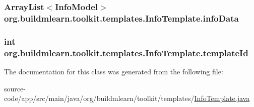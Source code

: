 \subsubsection[{\texorpdfstring{info\+Data}{infoData}}]{\setlength{\rightskip}{0pt plus 5cm}Array\+List$<${\bf Info\+Model}$>$ org.\+buildmlearn.\+toolkit.\+templates.\+Info\+Template.\+info\+Data\hspace{0.3cm}{\ttfamily [private]}}\hypertarget{classorg_1_1buildmlearn_1_1toolkit_1_1templates_1_1InfoTemplate_ad71b7f973a4cf7ffbb49f4443d15ee64}{}\label{classorg_1_1buildmlearn_1_1toolkit_1_1templates_1_1InfoTemplate_ad71b7f973a4cf7ffbb49f4443d15ee64}
\subsubsection[{\texorpdfstring{template\+Id}{templateId}}]{\setlength{\rightskip}{0pt plus 5cm}int org.\+buildmlearn.\+toolkit.\+templates.\+Info\+Template.\+template\+Id\hspace{0.3cm}{\ttfamily [private]}}\hypertarget{classorg_1_1buildmlearn_1_1toolkit_1_1templates_1_1InfoTemplate_a8aa87de71f3a80c02636551351a890cd}{}\label{classorg_1_1buildmlearn_1_1toolkit_1_1templates_1_1InfoTemplate_a8aa87de71f3a80c02636551351a890cd}


The documentation for this class was generated from the following file\+:\begin{DoxyCompactItemize}
\item 
source-\/code/app/src/main/java/org/buildmlearn/toolkit/templates/\hyperlink{InfoTemplate_8java}{Info\+Template.\+java}\end{DoxyCompactItemize}
